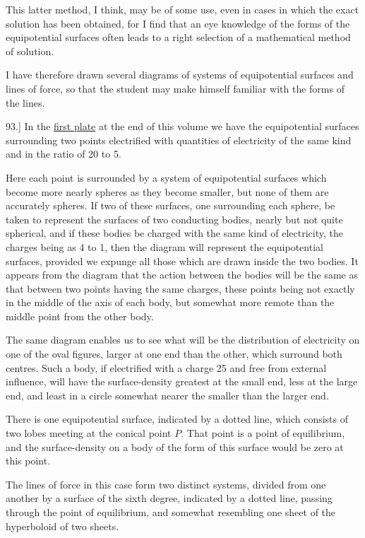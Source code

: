 \documentclass[12pt,oneside]{book}[2021/10/04]
\newcommand{\Runhead}[1]{\fancyhead[C]{\iffloatpage{}{\small#1}}}
\newcommand{\article}[1]{\phantomsection \label{art:#1}{#1.]}}
\newcommand{\¬}{\hphantom{0}}
\begin{document}
This latter method, I think, may be of some use, even in cases
in which the exact solution has been obtained, for I find that an
eye knowledge of the forms of the equipotential surfaces often leads
to a right selection of a mathematical method of solution.

I have therefore drawn several diagrams of systems of equipotential
surfaces and lines of force, so that the student may make
himself familiar with the forms of the lines.
\Runhead{DIAGRAMS OF EQUIPOTENTIAL SURFACES.}

\article{93} In the \hyperref[plate:1]{first plate} at the end of this volume we have the
equipotential surfaces surrounding two points electrified with quantities
of electricity of the same kind and in the ratio of 20 to 5.

Here each point is surrounded by a system of equipotential
surfaces which become more nearly spheres as they become smaller,
but none of them are accurately spheres. If two of these surfaces,
one surrounding each sphere, be taken to represent the surfaces
of two conducting bodies, nearly but not quite spherical, and if
these bodies be charged with the same kind of electricity, the
charges being as 4 to 1, then the diagram will represent the
equipotential surfaces, provided we expunge all those which are
drawn inside the two bodies. It appears from the diagram that
the action between the bodies will be the same as that between
two points having the same charges, these points being not exactly
in the middle of the axis of each body, but somewhat more remote
than the middle point from the other body.

The same diagram enables us to see what will be the distribution
of electricity on one of the oval figures, larger at one end
than the other, which surround both centres. Such a body, if electrified
with a charge 25 and free from external influence, will
have the surface-density greatest at the small end, less at the large
end, and least in a circle somewhat nearer the smaller than the
larger end.

There is one equipotential surface, indicated by a dotted line,
which consists of two lobes meeting at the conical point \(P\). That
point is a point of equilibrium, and the surface-density on a body
of the form of this surface would be zero at this point.

The lines of force in this case form two distinct systems, divided
from one another by a surface of the sixth degree, indicated by a
dotted line, passing through the point of equilibrium, and somewhat
resembling one sheet of the hyperboloid of two sheets.
\end{document}
